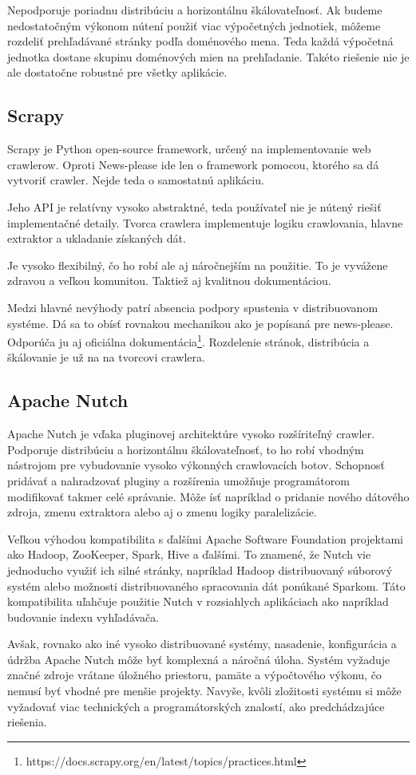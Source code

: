 Nepodporuje poriadnu distribúciu a horizontálnu škálovateľnosť. Ak budeme nedostatočným výkonom nútení použiť viac výpočetných jednotiek, môžeme rozdeliť prehľadávané stránky podľa doménového mena. Teda každá výpočetná jednotka dostane skupinu doménových mien na prehľadanie. Takéto riešenie nie je ale dostatočne robustné pre všetky aplikácie. 

\subsection{Scrapy} 
Scrapy je Python open-source framework, určený na implementovanie web crawlerow. Oproti News-please ide len o framework pomocou, ktorého sa dá vytvoriť crawler. Nejde teda o samostatnú aplikáciu. 

Jeho API je relatívny vysoko abstraktné, teda používateľ nie je nútený riešiť implementačné detaily. Tvorca crawlera implementuje logiku crawlovania, hlavne extraktor a ukladanie získaných dát.

Je vysoko flexibilný, čo ho robí ale aj náročnejším na použitie. To je vyvážene zdravou a veľkou komunitou. Taktiež aj kvalitnou dokumentáciou. 

Medzi hlavné nevýhody patrí absencia podpory spustenia v distribuovanom systéme. Dá sa to obísť rovnakou mechanikou ako je popísaná pre news-please. Odporúča ju aj oficiálna dokumentácia\footnote{https://docs.scrapy.org/en/latest/topics/practices.html}. Rozdelenie stránok, distribúcia a škálovanie je už na na tvorcovi crawlera. 

\subsection{Apache Nutch}
Apache Nutch je vďaka pluginovej architektúre vysoko rozšíriteľný crawler. Podporuje distribúciu a horizontálnu škálovateľnosť, to ho robí vhodným nástrojom pre vybudovanie vysoko výkonných crawlovacích botov. Schopnosť pridávať a nahradzovať pluginy a rozšírenia umožňuje programátorom modifikovať takmer celé správanie. Môže ísť napríklad o pridanie nového dátového zdroja, zmenu extraktora alebo aj o zmenu logiky paralelizácie. 

Veľkou výhodou kompatibilita s ďalšími Apache Software Foundation projektami ako Hadoop, ZooKeeper, Spark, Hive a ďalšími. To znamené, že Nutch vie jednoducho využiť ich silné stránky, napríklad Hadoop distribuovaný súborový systém alebo možnosti distribuovaného spracovania dát ponúkané Sparkom. Táto kompatibilita uľahčuje použitie Nutch v rozsiahlych aplikáciach ako napríklad budovanie indexu vyhľadávača. 

Avšak, rovnako ako iné vysoko distribuované systémy, nasadenie, konfigurácia a údržba Apache Nutch môže byť komplexná a náročná úloha. Systém vyžaduje značné zdroje vrátane úložného priestoru, pamäte a výpočtového výkonu, čo nemusí byť vhodné pre menšie projekty. Navyše, kvôli zložitosti systému si môže vyžadovať viac technických a programátorských znalostí, ako predchádzajúce riešenia.
